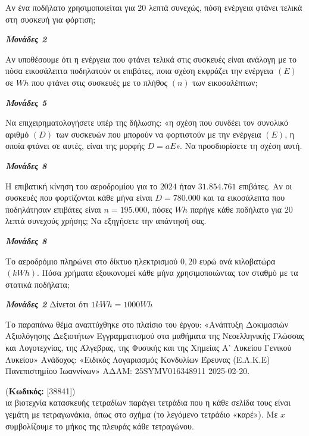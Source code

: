 \documentclass[11pt,a4paper,twoside]{book}
\newcounter{askhsh}[chapter]
\renewcommand{\theaskhsh}{
	\bf{\titlefont{\Large{\thechapter}}.\arabic{askhsh}}
}
\newcommand{\Askhsh}[2]{\refstepcounter{askhsh}{\titlefont{Άσκηση\theaskhsh} - \textcolor{maincolor}{ΘΕΜΑ #2}} (\small{\textbf{Κωδικός:} #1})\\}{}
\newcommand{\monades}[1]{
\hspace*{\fill}
\textbf{\textit{\textcolor{maincolor}{Μονάδες #1}}}}
\begin{document}
\begin{alist}
\item Αν ένα ποδήλατο χρησιμοποιείται για $20$ λεπτά συνεχώς, πόση ενέργεια φτάνει τελικά στη συσκευή για φόρτιση;
\monades{2}
\item

\begin{rlist}
\item Αν υποθέσουμε ότι η ενέργεια που φτάνει τελικά στις συσκευές είναι ανάλογη με το πόσα εικοσάλεπτα ποδηλατούν οι επιβάτες, ποια σχέση εκφράζει την ενέργεια $(E)$ σε $Wh$ που φτάνει στις συσκευές με το πλήθος $(n)$ των εικοσαλέπτων;
\monades{5}
\item Να επιχειρηματολογήσετε υπέρ της δήλωσης: «η σχέση που συνδέει τον συνολικό αριθμό $(D)$ των συσκευών που μπορούν να φορτιστούν με την ενέργεια $(E)$, η οποία φτάνει σε αυτές, είναι της μορφής $D = a E$». Να προσδιορίσετε τη σχέση αυτή.
\monades{8}
\end{rlist}
\item

\begin{rlist}
\item Η επιβατική κίνηση του αεροδρομίου για το $2024$ ήταν $31.854.761$ επιβάτες. Αν οι συσκευές που φορτίζονται κάθε μήνα είναι $D = 780.000$ και τα εικοσάλεπτα που ποδηλάτησαν επιβάτες είναι $n = 195.000$, πόσες $Wh$ παρήγε κάθε ποδήλατο για $20\ $λεπτά συνεχούς χρήσης; Να εξηγήσετε την απάντησή σας.
\monades{8}
\item Το αεροδρόμιο πληρώνει στο δίκτυο ηλεκτρισμού $0,20$ ευρώ ανά κιλοβατώρα $(kWh)$. Πόσα χρήματα εξοικονομεί κάθε μήνα χρησιμοποιώντας τον σταθμό με τα στατικά ποδήλατα;
\monades{2}
Δίνεται ότι $1\si{kWh} = 1000\si{Wh}$

{\footnotesize Το παραπάνω θέμα αναπτύχθηκε στο πλαίσιο του έργου: «Ανάπτυξη Δοκιμασιών Αξιολόγησης Δεξιοτήτων Εγγραμματισμού στα μαθήματα της Νεοελληνικής Γλώσσας και Λογοτεχνίας, της Άλγεβρας, της Φυσικής και της Χημείας Α' Λυκείου Γενικού Λυκείου» Ανάδοχος: «Ειδικός Λογαριασμός Κονδυλίων Έρευνας (Ε.Λ.Κ.Ε) Πανεπιστημίου Ιωαννίνων» ΑΔΑΜ: 25SYMV016348911 2025-02-20.}
\end{rlist}
\end{alist}

\vspace{4mm}

\Askhsh{[38841]}
Μια βιοτεχνία κατασκευής τετραδίων παράγει τετράδια που η κάθε σελίδα τους είναι γεμάτη με τετραγωνάκια, όπως στο σχήμα (το λεγόμενο τετράδιο «καρέ»). Με $x$ συμβολίζουμε το μήκος της πλευράς κάθε τετραγώνου.
\end{document}
